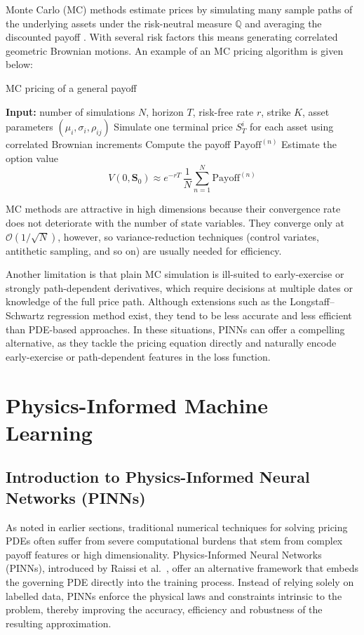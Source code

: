 \documentclass[12pt]{report} %
\theoremstyle{plain}           %
\theoremstyle{definition}      %
\theoremstyle{remark}          %
\begin{document}
Monte Carlo (MC) methods estimate prices by simulating many sample paths of the
underlying assets under the risk-neutral measure \(\mathbb Q\) and averaging the
discounted payoff \cite{glasserman2004monte}.  With several risk factors this
means generating correlated geometric Brownian motions.  An example of an MC
pricing algorithm is given below:
\begin{algorithm}[H]
  \caption{MC pricing of a general payoff}
  \begin{algorithmic}[1]
    \STATE \textbf{Input:} number of simulations \(N\), horizon \(T\), risk-free
           rate \(r\), strike \(K\), asset parameters
           \((\mu_i,\sigma_i,\rho_{ij})\)
      \STATE Simulate one terminal price \(S_T^{i}\) for each asset
             using correlated Brownian increments
      \STATE Compute the payoff
             \(\text{Payoff}^{(n)}\)
    \ENDFOR
    \STATE Estimate the option value
    \[
      V(0,\mathbf S_0)\approx e^{-rT}\,
        \frac1N\sum_{n=1}^{N}\text{Payoff}^{(n)}
    \]
  \end{algorithmic}
\end{algorithm}

MC methods are attractive in high dimensions because their convergence rate
does not deteriorate with the number of state variables.  They converge only at
\(\mathcal{O}(1/\sqrt N)\), however, so variance-reduction techniques (control
variates, antithetic sampling, and so on) are usually needed for efficiency.

Another limitation is that plain MC simulation is ill-suited to early-exercise
or strongly path-dependent derivatives, which require decisions at multiple
dates or knowledge of the full price path.  Although extensions such as the
Longstaff–Schwartz regression method \cite{longstaffshawrtz} exist, they tend
to be less accurate and less efficient than PDE-based approaches.  In these
situations, PINNs can offer a compelling
alternative, as they tackle the pricing equation directly and naturally encode
early-exercise or path-dependent features in the loss function.

\chapter{Physics-Informed Machine Learning}
\section{Introduction to Physics-Informed Neural Networks (PINNs)}
As noted in earlier sections, traditional numerical techniques for solving
pricing PDEs often suffer from severe
computational burdens that stem from complex payoff features or high
dimensionality. Physics-Informed Neural Networks (PINNs), introduced by Raissi
et al.\ \cite{RAISSI2019686}, offer an alternative framework that embeds the
governing PDE directly into the training process.  Instead of relying solely on
labelled data, PINNs enforce the physical laws and constraints intrinsic to the
problem, thereby improving the accuracy, efficiency and robustness of the
resulting approximation.
\end{document}
